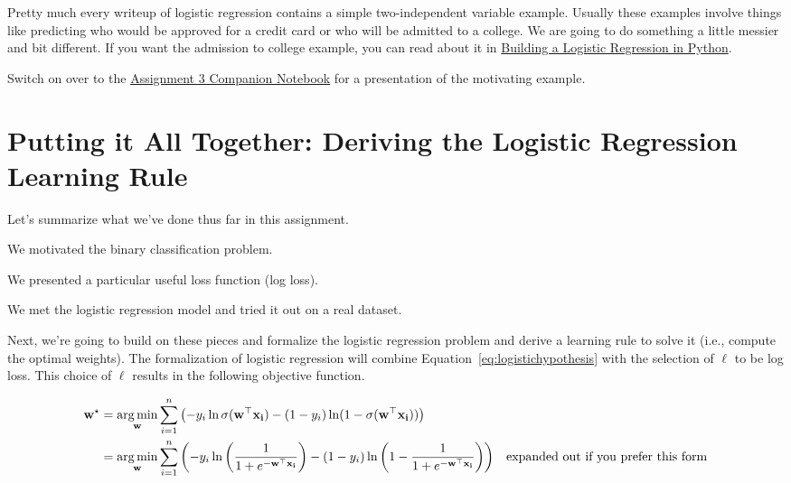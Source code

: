 \documentclass[assignment03_Solutions]{subfiles}
\begin{document}
\begin{notice}
Pretty much every writeup of logistic regression contains a simple two-independent variable example.  Usually these examples involve things like predicting who would be approved for a credit card or who will be admitted to a college.  We are going to do something a little messier and bit different.  If you want the admission to college example, you can read about it in \href{https://towardsdatascience.com/building-a-logistic-regression-in-python-301d27367c24}{Building a Logistic Regression in Python}.
\end{notice}

\begin{externalresources}[(60 minutes)]
Switch on over to the \href{https://colab.research.google.com/github/mlfa19/assignments/blob/master/Module\%201/03/Assignment_03_Companion.ipynb}{Assignment 3 Companion Notebook} for a presentation of the motivating example.
\end{externalresources}

\section{Putting it All Together: Deriving the Logistic Regression Learning Rule}
Let's summarize what we've done thus far in this assignment.

\bi
\item We motivated the binary classification problem.
\item We presented a particular useful loss function (log loss).
\item We met the logistic regression model and tried it out on a real dataset.
\ei

Next, we're going to build on these pieces and formalize the logistic regression problem and derive a learning rule to solve it (i.e., compute the optimal weights). The formalization of logistic regression will combine Equation~\ref{eq:logistichypothesis} with the selection of $\ell$ to be log loss.  This choice of $\ell$ results in the following objective function.

\begin{align}
\mathbf{w}^\star &= \operatorname*{arg\,min}_{\mathbf{w}} \sum_{i=1}^n \left ( - y_i \ln \sigma(\mathbf{w}^\top \mathbf{x_i}) - (1-y_i) \ln (1 - \sigma(\mathbf{w}^\top \mathbf{x_i}) ) \right) \\
&= \operatorname*{arg\,min}_{\mathbf{w}} \sum_{i=1}^n \left (  - y_i \ln \left ( \frac{1}{1+e^{-\mathbf{w}^\top \mathbf{x_i}}} \right) - (1-y_i) \ln  \left (1 - \frac{1}{1+e^{-\mathbf{w}^\top \mathbf{x_i}}} \right ) \right) &\mbox{expanded out if you prefer this form} \label{eq:objective}
\end{align}
\end{document}
